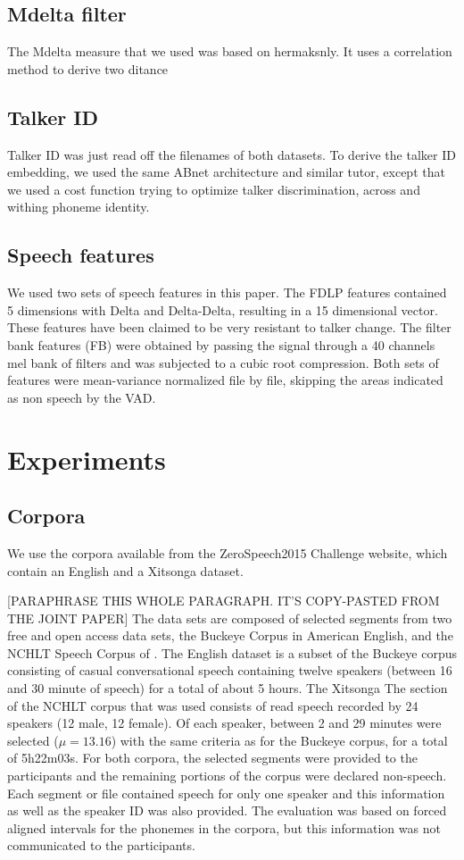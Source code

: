 \documentclass[a4paper]{article}
\begin{document}
\subsection{Mdelta filter}
The Mdelta measure that we used was based on hermaksnly. It uses a correlation method to derive two ditance

\subsection{Talker ID}
Talker ID was just read off the filenames of both datasets. To derive the talker ID embedding, we used the same ABnet architecture and similar tutor, except that we used a cost function trying to optimize talker discrimination, across and withing phoneme identity.

\subsection{Speech features}
We used two sets of speech features in this paper. The FDLP features contained 5 dimensions \cite{} with Delta and Delta-Delta, resulting in a 15 dimensional vector. These features have been claimed to be very resistant to talker change. The filter bank features (FB) were obtained by passing the signal through a 40 channels mel bank of filters and was subjected to a cubic root compression.  Both sets of features were mean-variance normalized file by file, skipping the areas indicated as non speech by the VAD.

\section{Experiments}
\subsection{Corpora}
We use the corpora available from the ZeroSpeech2015 Challenge website, which contain an English and a Xitsonga dataset.


[PARAPHRASE THIS WHOLE PARAGRAPH. IT'S COPY-PASTED FROM THE JOINT PAPER]
The data sets are composed of selected segments from two free and open access data sets, the Buckeye Corpus  in American English, and the NCHLT Speech Corpus of . The English dataset is a subset of the Buckeye corpus \cite{buckeye} consisting of casual conversational speech containing twelve speakers (between 16 and 30 minute of speech) for a total of about 5 hours. The Xitsonga \cite{xitsonga2014}The section of the NCHLT corpus that was used consists of read speech recorded by 24 speakers (12 male, 12 female). Of each speaker, between 2 and 29 minutes were selected ($\mu=13.16$) with the same criteria as for the Buckeye corpus, for a total of 5h22m03s. For both corpora, the selected segments were provided to the participants and the remaining portions of the corpus were declared non-speech. Each segment or file contained speech for only one speaker and this information as well as the speaker ID was also provided. The evaluation was based on forced aligned intervals for the phonemes in the corpora, but this information was not communicated to the participants.
\end{document}
